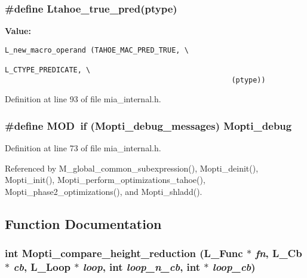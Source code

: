 \subsubsection{\setlength{\rightskip}{0pt plus 5cm}\#define \bf{Ltahoe\_\-true\_\-pred}(ptype)}\label{mia__internal_8h_50998bf6558e6fe82f3084b82a3d82b0}


\textbf{Value:}

\begin{Code}\begin{verbatim}L_new_macro_operand (TAHOE_MAC_PRED_TRUE, \
                                                     L_CTYPE_PREDICATE, \
                                                     (ptype))
\end{verbatim}\end{Code}


Definition at line 93 of file mia\_\-internal.h.
\subsubsection{\setlength{\rightskip}{0pt plus 5cm}\#define MOD~if (\bf{Mopti\_\-debug\_\-messages}) Mopti\_\-debug}\label{mia__internal_8h_ca7d5718ab8c38506adb3bef2469b319}




Definition at line 73 of file mia\_\-internal.h.

Referenced by M\_\-global\_\-common\_\-subexpression(), Mopti\_\-deinit(), Mopti\_\-init(), Mopti\_\-perform\_\-optimizations\_\-tahoe(), Mopti\_\-phase2\_\-optimizations(), and Mopti\_\-shladd().

\subsection{Function Documentation}
\subsubsection{\setlength{\rightskip}{0pt plus 5cm}int Mopti\_\-compare\_\-height\_\-reduction (L\_\-Func $\ast$ {\em fn}, L\_\-Cb $\ast$ {\em cb}, L\_\-Loop $\ast$ {\em loop}, int {\em loop\_\-n\_\-cb}, int $\ast$ {\em loop\_\-cb})}\label{mia__internal_8h_df58ac098e0582c80135d341848632ae}




